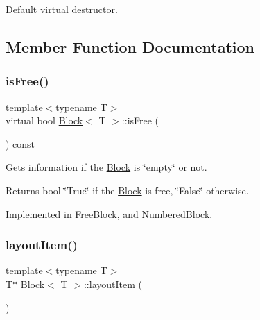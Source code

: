 Default virtual destructor. 



\subsection{Member Function Documentation}
\mbox{\label{class_block_a795e0536746b840286cb1e74487311a9}} 
\subsubsection{\texorpdfstring{isFree()}{isFree()}}
{\footnotesize\ttfamily template$<$typename T$>$ \\
virtual bool \mbox{\hyperlink{class_block}{Block}}$<$ T $>$\+::is\+Free (\begin{DoxyParamCaption}{ }\end{DoxyParamCaption}) const\hspace{0.3cm}{\ttfamily [pure virtual]}}



Gets information if the \mbox{\hyperlink{class_block}{Block}} is \char`\"{}empty\char`\"{} or not. 

\begin{DoxyReturn}{Returns}
bool \char`\"{}\+True\char`\"{} if the \mbox{\hyperlink{class_block}{Block}} is free, \char`\"{}\+False\char`\"{} otherwise. 
\end{DoxyReturn}


Implemented in \mbox{\hyperlink{class_free_block_a76d3f40934d42c566095ee2f1386eac5}{Free\+Block}}, and \mbox{\hyperlink{class_numbered_block_a04899b0e9d90f4ce4faa8aae9e4140e9}{Numbered\+Block}}.

\mbox{\label{class_block_adebc177a35bfd2ecaebd8fc23a6ceafb}} 
\subsubsection{\texorpdfstring{layoutItem()}{layoutItem()}}
{\footnotesize\ttfamily template$<$typename T$>$ \\
T$\ast$ \mbox{\hyperlink{class_block}{Block}}$<$ T $>$\+::layout\+Item (\begin{DoxyParamCaption}{ }\end{DoxyParamCaption})\hspace{0.3cm}{\ttfamily [inline]}}



